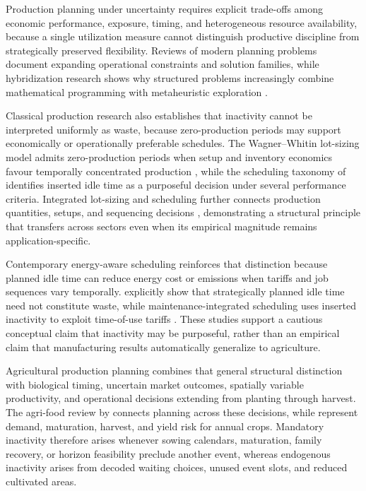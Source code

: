 \documentclass[]{interact}
\begin{document}
Production planning under uncertainty requires explicit trade-offs among economic performance, exposure, timing, and heterogeneous resource availability, because a single utilization measure cannot distinguish productive discipline from strategically preserved flexibility. Reviews of modern planning problems document expanding operational constraints and solution families, while hybridization research shows why structured problems increasingly combine mathematical programming with metaheuristic exploration \citep{Battaia2013,Boysen2022,Battaia2022}.

Classical production research also establishes that inactivity cannot be interpreted uniformly as waste, because zero-production periods may support economically or operationally preferable schedules. The Wagner--Whitin lot-sizing model admits zero-production periods when setup and inventory economics favour temporally concentrated production \citep{WagnerWhitin1958}, while the scheduling taxonomy of \citet{KanetSridharan2000} identifies inserted idle time as a purposeful decision under several performance criteria. Integrated lot-sizing and scheduling further connects production quantities, setups, and sequencing decisions \citep{Jodlbauer2006}, demonstrating a structural principle that transfers across sectors even when its empirical magnitude remains application-specific.

Contemporary energy-aware scheduling reinforces that distinction because planned idle time can reduce energy cost or emissions when tariffs and job sequences vary temporally. \citet{TrevinoMartinez2022} explicitly show that strategically planned idle time need not constitute waste, while maintenance-integrated scheduling uses inserted inactivity to exploit time-of-use tariffs \citep{An2023}. These studies support a cautious conceptual claim that inactivity may be purposeful, rather than an empirical claim that manufacturing results automatically generalize to agriculture.

Agricultural production planning combines that general structural distinction with biological timing, uncertain market outcomes, spatially variable productivity, and operational decisions extending from planting through harvest. The agri-food review by \citet{Ahumada2009} connects planning across these decisions, while \citet{Tan2012} represent demand, maturation, harvest, and yield risk for annual crops. Mandatory inactivity therefore arises whenever sowing calendars, maturation, family recovery, or horizon feasibility preclude another event, whereas endogenous inactivity arises from decoded waiting choices, unused event slots, and reduced cultivated areas.
\end{document}
